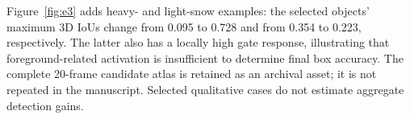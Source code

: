 Figure~\ref{fig:e3} adds heavy- and light-snow examples: the selected objects' maximum 3D IoUs change from 0.095 to 0.728 and from 0.354 to 0.223, respectively. The latter also has a locally high gate response, illustrating that foreground-related activation is insufficient to determine final box accuracy. The complete 20-frame candidate atlas is retained as an archival asset; it is not repeated in the manuscript. Selected qualitative cases do not estimate aggregate detection gains.











